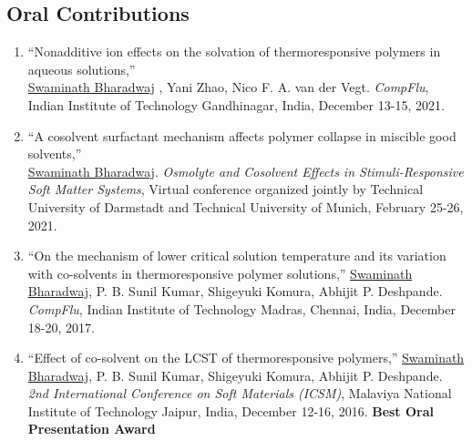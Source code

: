\documentclass[a4paper,14pt]{article}
\begin{document}
\subsection*{\normalsize Oral Contributions}
\begin{enumerate}
\item
\enquote{Nonadditive ion effects on the solvation of thermoresponsive polymers
in aqueous solutions,}\\ \underline{Swaminath Bharadwaj} , Yani Zhao, Nico F. A.
van der Vegt. \textit{CompFlu}, Indian Institute of Technology Gandhinagar,
India, December 13-15, 2021.
\item
\enquote{A cosolvent surfactant mechanism affects polymer collapse in miscible
good solvents,} \\\underline{Swaminath Bharadwaj}. \textit{Osmolyte and Cosolvent
Effects in Stimuli-Responsive Soft Matter Systems}, Virtual conference
organized jointly by Technical University of Darmstadt and Technical University
of Munich, February 25-26, 2021.
\item
\enquote{On the mechanism of lower critical solution temperature and its
variation with co-solvents in thermoresponsive polymer solutions,}
\underline{Swaminath Bharadwaj}, P. B. Sunil Kumar, Shigeyuki Komura, Abhijit
P. Deshpande. \textit{CompFlu}, Indian Institute of Technology Madras,  Chennai,
India, December 18-20, 2017.
\item
\enquote{Effect of co-solvent on the LCST of thermoresponsive
polymers,} \underline{Swaminath Bharadwaj}, P. B. Sunil Kumar, Shigeyuki Komura,
Abhijit P. Deshpande. \textit{2nd International Conference on Soft Materials
(ICSM)}, Malaviya National Institute of Technology Jaipur, India, December
12-16, 2016. \textbf{Best Oral Presentation Award}
\end{enumerate}
\end{document}

